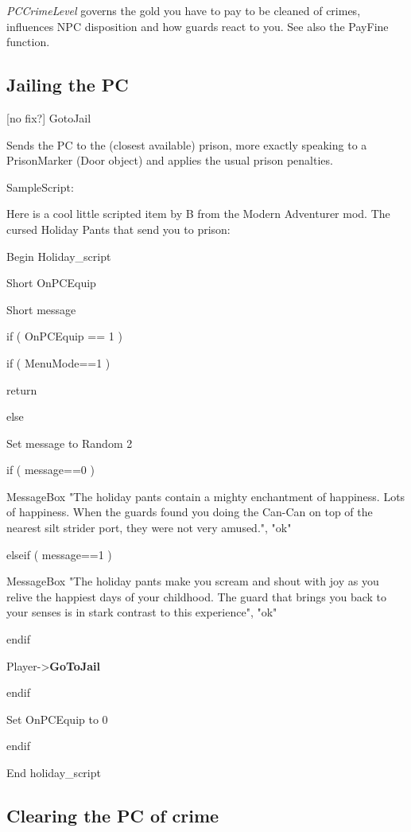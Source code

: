 \documentclass[
]{article}
\begin{document}
\emph{PCCrimeLevel} governs the gold you have to pay to be cleaned of
crimes, influences NPC disposition and how guards react to you. See also
the PayFine function.

\hypertarget{jailing-the-pc}{%
\subsection{Jailing the PC}\label{jailing-the-pc}}

{[}no fix?{]} GotoJail

Sends the PC to the (closest available) prison, more exactly speaking to
a PrisonMarker (Door object) and applies the usual prison penalties.

SampleScript:

Here is a cool little scripted item by B from the Modern Adventurer mod.
The cursed Holiday Pants that send you to prison:

Begin Holiday\_script

Short OnPCEquip

Short message

if ( OnPCEquip == 1 )

if ( MenuMode==1 )

return

else

Set message to Random 2

if ( message==0 )

MessageBox "The holiday pants contain a mighty enchantment of happiness.
Lots of happiness. When the guards found you doing the Can-Can on top of
the nearest silt strider port, they were not very amused.", "ok"

elseif ( message==1 )

MessageBox "The holiday pants make you scream and shout with joy as you
relive the happiest days of your childhood. The guard that brings you
back to your senses is in stark contrast to this experience", "ok"

endif

Player-\textgreater{}\textbf{GoToJail}

endif

Set OnPCEquip to 0

endif

End holiday\_script

\hypertarget{clearing-the-pc-of-crime}{%
\subsection{Clearing the PC of crime}\label{clearing-the-pc-of-crime}}
\end{document}
